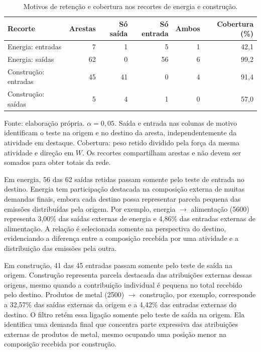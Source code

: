 \begin{table}[htbp]
\centering
\caption{Motivos de retenção e cobertura nos recortes de energia e construção.}
\label{tab:motivos-casos}
\small
\begin{tabular}{@{}lrrrrr@{}}
\toprule
Recorte & Arestas & Só saída & Só entrada & Ambos & Cobertura (\%) \\
\midrule
Energia: entradas & 7 & 1 & 5 & 1 & 42,1 \\
Energia: saídas & 62 & 0 & 56 & 6 & 99,2 \\
Construção: entradas & 45 & 41 & 0 & 4 & 91,4 \\
Construção: saídas & 5 & 4 & 1 & 0 & 57,0 \\
\bottomrule
\end{tabular}
\par\smallskip\begin{minipage}{\textwidth}\footnotesize
Fonte: elaboração própria. $\alpha=0{,}05$. Saída e entrada nas colunas de motivo identificam o teste na origem e no destino da aresta, independentemente da atividade em destaque. Cobertura: peso retido dividido pela força da mesma atividade e direção em $W$. Os recortes compartilham arestas e não devem ser somados para obter totais da rede.
\end{minipage}
\end{table}

Em energia, 56 das 62 saídas retidas passam somente pelo teste de entrada no destino. Energia tem participação destacada na composição externa de muitas demandas finais, embora cada destino possa representar parcela pequena das emissões distribuídas pela origem. Por exemplo, energia $\rightarrow$ alimentação (5600) representa 3,00\% das saídas externas de energia e 4,86\% das entradas externas de alimentação. A relação é selecionada somente na perspectiva do destino, evidenciando a diferença entre a composição recebida por uma atividade e a distribuição das emissões pela outra.

Em construção, 41 das 45 entradas passam somente pelo teste de saída na origem. Construção representa parcela destacada das atribuições externas dessas origens, mesmo quando a contribuição individual é pequena no total recebido pelo destino. Produtos de metal (2500) $\rightarrow$ construção, por exemplo, corresponde a 32,57\% das saídas externas da origem e a 4,42\% das entradas externas do destino. O filtro retém essa ligação somente pelo teste de saída na origem. Ela identifica uma demanda final que concentra parte expressiva das atribuições externas de produtos de metal, mesmo ocupando uma posição menor na composição recebida por construção.


